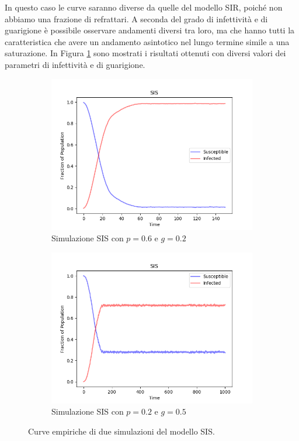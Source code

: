 \documentclass{article}
\begin{document}
    In questo caso le curve saranno diverse da quelle del modello SIR, poiché non abbiamo una frazione di refrattari.
    A seconda del grado di infettività e di guarigione è possibile osservare andamenti diversi tra loro, ma che hanno
    tutti la caratteristica che avere un andamento asintotico nel lungo termine simile a una saturazione. In Figura
    \ref{fig:sis_curves} sono mostrati i risultati ottenuti con diversi valori dei parametri di infettività e di guarigione.
    \begin{figure}[H]
        \centering
        \begin{subfigure}[b]{0.49\linewidth}
         \centering
         \includegraphics[width=\linewidth]{../images/SIS_curves}
            \caption{Simulazione SIS con $p=0.6$ e $g=0.2$}
     \end{subfigure}
        \hfill
        \begin{subfigure}[b]{0.49\linewidth}
         \centering
         \includegraphics[width=\linewidth]{../images/SIS_curves1}
            \caption{Simulazione SIS con $p=0.2$ e $g=0.5$}
     \end{subfigure}
     \caption{Curve empiriche di due simulazioni del modello SIS.}
     \label{fig:sis_curves}
    \end{figure}
\end{document}
